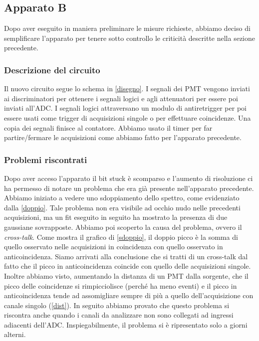 \subsection{Apparato B}

Dopo aver eseguito in maniera preliminare le misure richieste, abbiamo deciso di semplificare l'apparato per tenere sotto controllo le criticità descritte nella sezione precedente.

\subsubsection{Descrizione del circuito}

Il nuovo circuito segue lo schema in \autoref{disegno}.
I segnali dei PMT vengono inviati ai discriminatori per ottenere i segnali logici e agli attenuatori per essere poi inviati all'ADC. I segnali logici attraversano un modulo di antiretrigger per poi essere usati come trigger di acquisizioni singole o per effettuare coincidenze. Una copia dei segnali finisce al contatore. Abbiamo usato il timer per far partire/fermare le acquisizioni come abbiamo fatto per l'apparato precedente.

\subsubsection{Problemi riscontrati}

Dopo aver acceso l'apparato il bit stuck è scomparso e l'aumento di risoluzione ci ha permesso di notare un problema che era già presente nell'apparato precedente. Abbiamo iniziato a vedere uno sdoppiamento dello spettro, come evidenziato dalla \autoref{doppio}. Tale problema non era visibile ad occhio nudo nelle precedenti acquisizioni, ma un fit eseguito in seguito ha mostrato la presenza di due gaussiane sovrapposte.
Abbiamo poi scoperto la causa del problema, ovvero il \emph{cross-talk}.
Come mostra il grafico di \autoref{sdoppio}, il doppio picco è la somma di quello osservato nelle acquisizioni in coincidenza con quello osservato in anticoincidenza. Siamo arrivati alla conclusione che si tratti di un cross-talk dal fatto che il picco in anticoincidenza coincide con quello delle acquisizioni singole. Inoltre abbiamo visto, aumentando la distanza di un PMT dalla sorgente, che il picco delle coincidenze si rimpicciolisce (perché ha meno eventi) e il picco in anticoincidenza tende ad assomigliare sempre di più a quello dell'acquisizione con canale singolo (\autoref{dist}). In seguito abbiamo provato che questo problema si riscontra anche quando i canali da analizzare non sono collegati ad ingressi adiacenti dell'ADC. Inspiegabilmente, il problema si è ripresentato solo a giorni alterni. 

